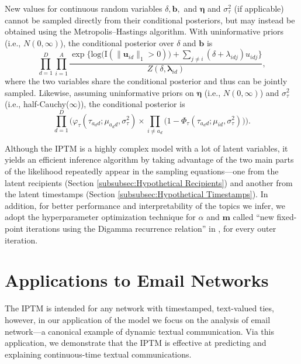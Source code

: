 \documentclass{article}
\begin{document}
  	   New values for continuous random variables $\delta, \boldsymbol{b},$ and $\boldsymbol{\eta}$ and $\sigma^2_\tau$ (if applicable) cannot be sampled directly from their conditional posteriors, but may instead be obtained using the Metropolis--Hastings algorithm. With uninformative priors (i.e., $N({0},\infty)$), the conditional posterior over $\delta$ and $\boldsymbol{b}$ is
  	   \begin{equation}
\prod_{d=1}^D
\prod_{i=1}^A \frac{\exp\Big\{\mbox{log}\big(\text{I}( \lVert \boldsymbol{u}_{id}\rVert_1 > 0)\big) + \sum\limits_{j \neq i} (\delta+\lambda_{idj})u_{idj}\Big\}}{Z(\delta,\boldsymbol{\lambda}_{id})},
\end{equation}
where the two variables share the conditional posterior and thus can be jointly sampled. Likewise, assuming uninformative priors on $\boldsymbol{\eta}$ (i.e., $N({0},\infty)$) and $\sigma_{\tau}^2$ (i.e., half-Cauchy($\infty$)), the conditional posterior is
\begin{equation}
\prod_{d=1}^D\Big(\varphi_{\tau}(\tau_{a_d d}; \mu_{a_d d}, \sigma_\tau^2)\times \prod_{i\neq a_d}\big(1-\Phi_{\tau}(\tau_{a_d d}; \mu_{i d}, \sigma_\tau^2) \big)\Big).
\end{equation}

Although the IPTM is a highly complex model with a lot of latent variables, it yields an efficient inference algorithm by taking advantage of the two main parts of the likelihood  repeatedly appear in the sampling equations---one from the latent recipients (Section \ref{subsubsec:Hypothetical Recipients}) and another from the latent timestamps (Section \ref{subsubsec:Hypothetical Timestamps}). In addition, for better performance and interpretability of the topics we infer, we adopt the hyperparameter optimization technique for $\alpha$ and $\boldsymbol{m}$ called ``new fixed-point iterations using the Digamma recurrence relation'' in \cite{wallach2008structured}, for every outer iteration. 
\section{Applications to Email Networks}\label{sec:Application}
The IPTM is intended for any network with timestamped, text-valued ties, however, in our application of the model we focus on the analysis of email network---a canonical example of dynamic textual communication. Via this application, we demonstrate that the IPTM is effective at predicting
and explaining continuous-time textual communications.
\end{document}
